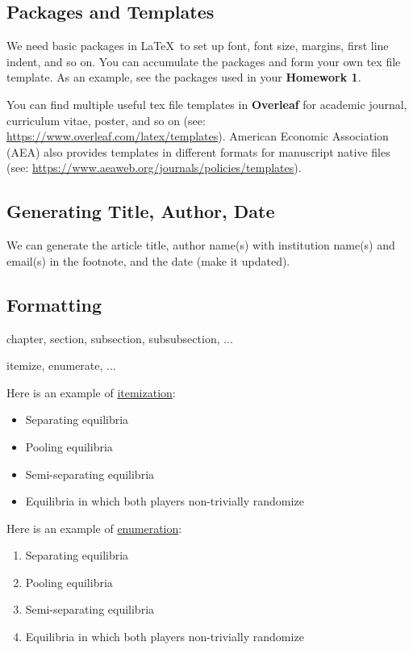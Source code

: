 \documentclass[10pt]{extarticle}
\theoremstyle{theorem}
\theoremstyle{lemma}
\theoremstyle{proposition}
\theoremstyle{corollary}
\theoremstyle{assumption}
\theoremstyle{model}
\theoremstyle{property}
\theoremstyle{example}
\theoremstyle{algorithm}
\theoremstyle{definition}
\theoremstyle{axiom}
\theoremstyle{remark}
\begin{document}
\subsection{Packages and Templates}

We need basic packages in \LaTeX \ to set up font, font size, margins, first line indent, and so on. You can accumulate the packages and form your own tex file template. As an example, see the packages used in your \textbf{Homework 1}.

You can find multiple useful tex file templates in \textbf{Overleaf} for academic journal, curriculum vitae, poster, and so on (see: \href{https://www.overleaf.com/latex/templates}{https://www.overleaf.com/latex/templates}). American Economic Association (AEA) also provides templates in different formats for manuscript native files (see: \href{https://www.aeaweb.org/journals/policies/templates}{https://www.aeaweb.org/journals/policies/templates}).


\subsection{Generating Title, Author, Date}

We can generate the article title, author name(s) with institution name(s) and email(s) in the footnote, and the date (make it updated).

\subsection{Formatting}

chapter, section, subsection, subsubsection, ...

itemize, enumerate, ...

Here is an example of \underline{itemization}:
\begin{itemize}
\item Separating equilibria
\item Pooling equilibria
\item Semi-separating equilibria
\item Equilibria in which both players non-trivially randomize
\end{itemize}

Here is an example of \underline{enumeration}:
\begin{enumerate}
\item Separating equilibria
\item Pooling equilibria
\item Semi-separating equilibria
\item Equilibria in which both players non-trivially randomize 
\end{enumerate}
\end{document}

